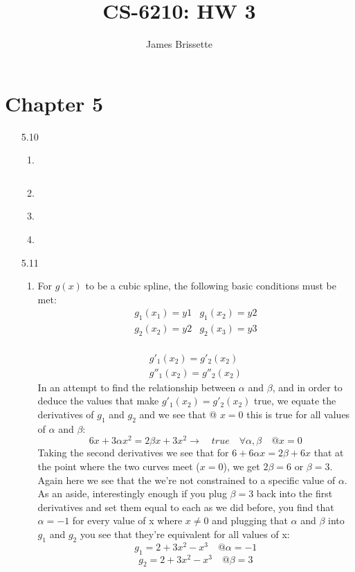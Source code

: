 \documentclass[11pt,a4paper]{article}
\author{James Brissette}
\title{CS-6210: HW 3}
\begin{document}
	\maketitle
	
	\section{Chapter 5}
		\begin{itemize}
			\item[5.10]
				\begin{enumerate} [label={\alph*)}]
					\item ~
					\begin{lstlisting} 
					\end{lstlisting}
					\item ~
					
					\item ~
					\item ~
				\end{enumerate}
					
			\item[5.11]
				\begin{enumerate} [label={\alph*)}]
					\item For $g(x)$ to be a cubic spline, the following basic conditions must be met:
					$$\begin{array}{cc}
						g_1(x_1)=y1 & g_1(x_2)=y2 \\
						g_2(x_2)=y2 & g_2(x_3)=y3 
					\end{array}$$~
					$$\begin{array}{c}
						g'_1(x_2)=g'_2(x_2)\\
						g''_1(x_2)=g''_2(x_2)
					\end{array}$$
					In an attempt to find the relationship between $\alpha$ and $\beta$, and in order to deduce the values that make $g'_1(x_2)=g'_2(x_2)$ true, we equate the derivatives of $g_1$ and $g_2$ and we see that @ $x=0$ this is true for all values of $\alpha$ and $\beta$:
					$$6x+3\alpha x^2=2 \beta x + 3x^2 \rightarrow \quad true \quad \forall \alpha,\beta \quad @x=0$$
					Taking the second derivatives we see that for $6+6\alpha x = 2 \beta + 6x$ that at the point where the two curves meet ($x=0$), we get $2\beta = 6$ or $\beta = 3$. Again here we see that the we're not constrained to a specific value of $\alpha$. As an aside, interestingly enough if you plug $\beta = 3$ back into the first derivatives and set them equal to each as we did before, you find that $\alpha = -1$ for every value of x where $x\neq0$ and plugging that $\alpha$ and $\beta$ into $g_1$ and $g_2$ you see that they're equivalent for all values of x:
					$$g_1 = 2+3x^2 -x^3 \quad @\alpha=-1$$
					$$g_2 = 2+3x^2 -x^3 \quad @\beta=3$$
					

\end{enumerate}
\end{itemize}
\end{document}
